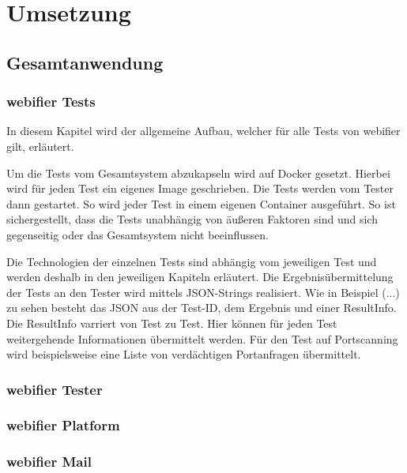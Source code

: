 \chapter{Umsetzung}

\section{Gesamtanwendung}


\subsection{webifier Tests}
In diesem Kapitel wird der allgemeine Aufbau, welcher für alle Tests von webifier gilt, erläutert.

Um die Tests vom Gesamtsystem abzukapseln wird auf Docker gesetzt. Hierbei wird für jeden Test ein eigenes Image geschrieben. Die Tests werden vom Tester dann gestartet. So wird jeder Test in einem eigenen Container ausgeführt. So ist sichergestellt, dass die Tests unabhängig von äußeren Faktoren sind und sich gegenseitig oder das Gesamtsystem nicht beeinflussen.

Die Technologien der einzelnen Tests sind abhängig vom jeweiligen Test und werden deshalb in den jeweiligen Kapiteln erläutert. Die Ergebnisübermittelung der Tests an den Tester wird mittels JSON-Strings realisiert. Wie in Beispiel (...) zu sehen besteht das JSON aus der Test-ID, dem Ergebnis und einer ResultInfo. Die ResultInfo varriert von Test zu Test. Hier können für jeden Test weitergehende Informationen übermittelt werden. Für den Test auf Portscanning wird beispielsweise eine Liste von verdächtigen Portanfragen übermittelt.

\subsection{webifier Tester}


\subsection{webifier Platform}


\subsection{webifier Mail}


